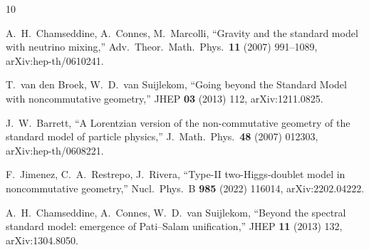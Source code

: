\documentclass[11pt,a4paper]{article}
\begin{document}
\begin{thebibliography}{10}

  A.~H.~Chamseddine, A.~Connes, M.~Marcolli,
  ``Gravity and the standard model with neutrino mixing,''
  Adv.\ Theor.\ Math.\ Phys.\ \textbf{11} (2007) 991--1089,
  arXiv:hep-th/0610241.

  T.~van den Broek, W.~D.~van Suijlekom,
  ``Going beyond the Standard Model with noncommutative geometry,''
  JHEP \textbf{03} (2013) 112,
  arXiv:1211.0825.

  J.~W.~Barrett,
  ``A Lorentzian version of the non-commutative geometry of the standard model of particle physics,''
  J.\ Math.\ Phys.\ \textbf{48} (2007) 012303,
  arXiv:hep-th/0608221.

  F.~Jimenez, C.~A.~Restrepo, J.~Rivera,
  ``Type-II two-Higgs-doublet model in noncommutative geometry,''
  Nucl.\ Phys.\ B \textbf{985} (2022) 116014,
  arXiv:2202.04222.

  A.~H.~Chamseddine, A.~Connes, W.~D.~van Suijlekom,
  ``Beyond the spectral standard model: emergence of Pati--Salam unification,''
  JHEP \textbf{11} (2013) 132,
  arXiv:1304.8050.

\end{thebibliography}
\end{document}
